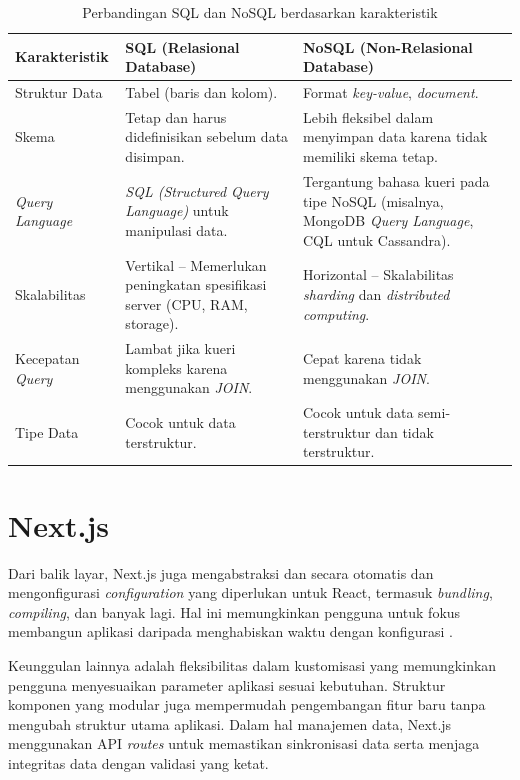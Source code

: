 \begin{table}[H]
    \centering
    \caption{Perbandingan SQL dan NoSQL berdasarkan karakteristik}
    \label{tab:sql_vs_nosql}
    \scriptsize %
    \setlength{\tabcolsep}{6pt} %
    \renewcommand{\arraystretch}{1.2} %
    \begin{tabular}{|l|p{5cm}|p{4cm}|}
        \hline
        \textbf{Karakteristik} & \textbf{SQL (Relasional Database)} & \textbf{NoSQL (Non-Relasional Database)} \\
        \hline
        Struktur Data & Tabel (baris dan kolom). & Format \textit{key-value}, \textit{document}. \\
        \hline
        Skema & Tetap dan harus didefinisikan sebelum data disimpan. & Lebih fleksibel dalam menyimpan data karena tidak memiliki skema tetap. \\
        \hline
        \textit{Query Language} & \textit{SQL (Structured Query Language)} untuk manipulasi data. & Tergantung bahasa kueri pada tipe NoSQL (misalnya, MongoDB \textit{Query Language}, CQL untuk Cassandra). \\
        \hline
        Skalabilitas & Vertikal – Memerlukan peningkatan spesifikasi server (CPU, RAM, storage). & Horizontal – Skalabilitas \textit{sharding} dan \textit{distributed computing}. \\
        \hline
        Kecepatan \textit{Query} & Lambat jika kueri kompleks karena menggunakan \textit{JOIN}. & Cepat karena tidak menggunakan \textit{JOIN}. \\
        \hline
        Tipe Data & Cocok untuk data terstruktur. & Cocok untuk data semi-terstruktur dan tidak terstruktur. \\
        \hline
    \end{tabular}
\end{table}

\section{Next.js}
Dari balik layar, Next.js juga mengabstraksi dan secara otomatis dan mengonfigurasi \textit{configuration} yang diperlukan untuk React, termasuk \textit{bundling}, \textit{compiling}, dan banyak lagi. Hal ini memungkinkan pengguna untuk fokus membangun aplikasi daripada menghabiskan waktu dengan konfigurasi \citep{nextjsdoc2025}.

Keunggulan lainnya adalah fleksibilitas dalam kustomisasi yang memungkinkan pengguna menyesuaikan parameter aplikasi sesuai kebutuhan. Struktur komponen yang modular juga mempermudah pengembangan fitur baru tanpa mengubah struktur utama aplikasi. Dalam hal manajemen data, Next.js menggunakan API \textit{routes} untuk memastikan sinkronisasi data serta menjaga integritas data dengan validasi yang ketat.

